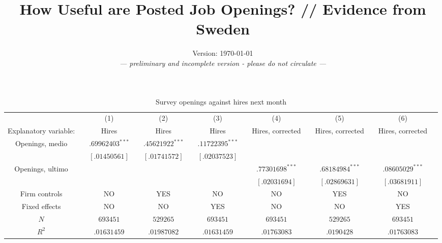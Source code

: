 \documentclass[11pt,article]{memoir}
\title{How Useful are Posted Job Openings? // Evidence from Sweden}
\date{Version: \today{}\\\emph{--- preliminary and incomplete version - please do not circulate ---}}
\begin{document}
\begin{landscape}
\begin{table}%
\caption*{Survey openings against hires next month}
\begin{tabularx}{\linewidth}{cXcXcXcXcXcXcX}
\hline
&& (1)							
&& (2)					
&& (3)
&& (4)
&& (5)
&& (6) \\
Explanatory variable: 
&& Hires
&& Hires 			
&& Hires
&& Hires, corrected 
&& Hires, corrected 
&& Hires, corrected \\ 
\hline 
Openings, medio    
& & $ .69962403^{***}$          								
& & $.45621922^{***}$		   				
& & $.11722395^{***}$	         							
& &\\[0 mm]
&&\scriptsize{$[.01450561]$}       
&&\scriptsize{$[.01741572]$}
&&\scriptsize{$[.02037523]$}
&&\scriptsize{$$}
&&\scriptsize{$$}
&&\scriptsize{$$}
\\
Openings, ultimo    
& & 
& & 		   				
& & 		        
& &$.77301698^{***}$									
& &$.68184984^{***}$	
&& $.08605029^{***}$										
\\[0 mm]
&&\scriptsize{$$}
&&\scriptsize{$$}
&&\scriptsize{$$}
&&\scriptsize{$[.02031694]$}
&&\scriptsize{$[.02869631]$}
&&\scriptsize{$[.03681911]$}
\\	
Firm controls
& & NO 									
& & YES		   				
& & NO		        
& &	NO								
& &	YES								
& & NO
\\	
Fixed effects
& & NO									
& & NO		   				
& & YES		        
& &	NO								
& &	NO								
& & YES
\\	
$N $
& & $693451$									
& & $529265$		   				
& & $693451$				        
& &	$693451$								
& &	$529265$									
& & $693451$
\\	
$R^2$
& & $.01631459$
& & $.01987082$		   				
& & $.01631459$		        
& &	$.01763083$								
& &	$.0190428$								
& &$.01763083$
\\		
\hline 
\end{tabularx}
\end{table}
\end{landscape}
\end{document}
